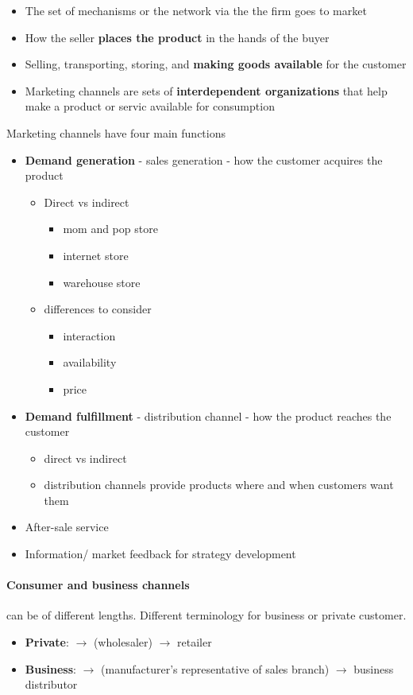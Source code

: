\documentclass[a4paper,titlepage] {scrartcl}
\begin{document}
\begin{itemize}
	\item The set of mechanisms or the network via the the firm goes to market
	\item How the seller \textbf{places the product} in the hands of the buyer
	\item Selling, transporting, storing, and \textbf{making goods available} for the customer
	\item Marketing channels are sets of \textbf{interdependent organizations} that help make a product or servic available for consumption
\end{itemize}

Marketing channels have four main functions
\begin{itemize}
	\item \textbf{Demand generation} - sales generation - how the customer acquires the product
	\begin{itemize}
		\item Direct vs indirect
		\begin{itemize}
			\item mom and pop store
			\item internet store
			\item warehouse store
		\end{itemize}
		\item differences to consider
		\begin{itemize}
			\item interaction
			\item availability
			\item price
		\end{itemize}
	\end{itemize}
	
	\item \textbf{Demand fulfillment} - distribution channel - how the product reaches the customer
	\begin{itemize}
		\item direct vs indirect
		\item distribution channels provide products where and when customers want them
	\end{itemize}
	\item After-sale service	
	\item Information/ market feedback for strategy development
\end{itemize}



\paragraph{Consumer and business channels} %
\label{par:consumer_and_business_channels}
can be of different lengths. Different terminology for business or private customer.
\begin{itemize}
	\item \textbf{Private}: $\rightarrow$
	 						(wholesaler) 
							$\rightarrow$ 
							retailer
	\item \textbf{Business}: $\rightarrow$ (manufacturer's representative of sales branch) $\rightarrow$ business distributor
\end{itemize}
\end{document}
